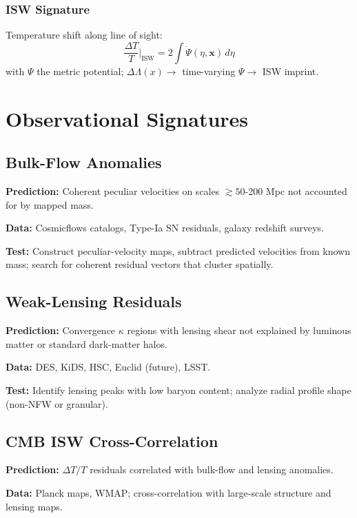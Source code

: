 \documentclass[11pt,a4paper]{article}
\begin{document}
\subsubsection{ISW Signature}

Temperature shift along line of sight:
\begin{equation}
\frac{\Delta T}{T}\Big|_{\text{ISW}} = 2\int \dot\Psi(\eta,\mathbf{x})\,d\eta
\end{equation}
with $\Psi$ the metric potential; $\Delta\Lambda(x) \rightarrow$ time-varying $\Psi \rightarrow$ ISW imprint.

\section{Observational Signatures}

\subsection{Bulk-Flow Anomalies}

\textbf{Prediction:} Coherent peculiar velocities on scales $\gtrsim 50$-200 Mpc not accounted for by mapped mass.

\textbf{Data:} Cosmicflows catalogs, Type-Ia SN residuals, galaxy redshift surveys.

\textbf{Test:} Construct peculiar-velocity maps, subtract predicted velocities from known mass; search for coherent residual vectors that cluster spatially.

\subsection{Weak-Lensing Residuals}

\textbf{Prediction:} Convergence $\kappa$ regions with lensing shear not explained by luminous matter or standard dark-matter halos.

\textbf{Data:} DES, KiDS, HSC, Euclid (future), LSST.

\textbf{Test:} Identify lensing peaks with low baryon content; analyze radial profile shape (non-NFW or granular).

\subsection{CMB ISW Cross-Correlation}

\textbf{Prediction:} $\Delta T/T$ residuals correlated with bulk-flow and lensing anomalies.

\textbf{Data:} Planck maps, WMAP; cross-correlation with large-scale structure and lensing maps.
\end{document}
